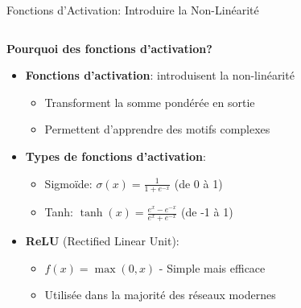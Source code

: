 \documentclass[aspectratio=169,11pt]{beamer}
\begin{document}
\begin{frame}{Fonctions d'Activation: Introduire la Non-Linéarité}
    \begin{columns}
        \begin{column}{0.55\textwidth}
            \textbf{Pourquoi des fonctions d'activation?}
            \begin{itemize}
                \item \textbf{Fonctions d'activation}: introduisent la non-linéarité
                \begin{itemize}
                    \item Transforment la somme pondérée en sortie
                    \item Permettent d'apprendre des motifs complexes
                \end{itemize}
                \vspace{0.2cm}
                \item \textbf{Types de fonctions d'activation}:
                \begin{itemize}
                    \item Sigmoïde: $\sigma(x) = \frac{1}{1+e^{-x}}$ (de 0 à 1)
                    \item Tanh: $\tanh(x) = \frac{e^x - e^{-x}}{e^x + e^{-x}}$ (de -1 à 1)
                \end{itemize}
                \vspace{0.2cm}
                \item \textbf{ReLU} (Rectified Linear Unit):
                \begin{itemize}
                    \item $f(x) = \max(0, x)$ - Simple mais efficace
                    \item Utilisée dans la majorité des réseaux modernes
                \end{itemize}
            \end{itemize}
        \end{column}
        \begin{column}{0.45\textwidth}
            \begin{center}
\end{center}
\end{column}
\end{columns}
\end{frame}
\end{document}
